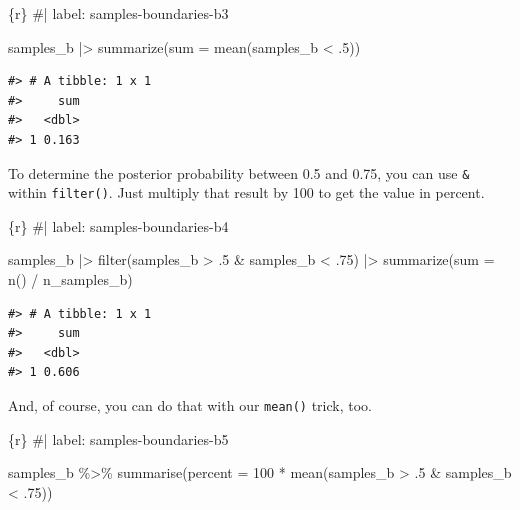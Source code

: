 \documentclass[
  letterpaper,
  DIV=11,
  numbers=noendperiod]{scrreprt}
\newenvironment{Shaded}{\begin{snugshade}}{\end{snugshade}}
\newcommand{\AttributeTok}[1]{\textcolor[rgb]{0.40,0.45,0.13}{#1}}
\newcommand{\CommentTok}[1]{\textcolor[rgb]{0.37,0.37,0.37}{#1}}
\newcommand{\DecValTok}[1]{\textcolor[rgb]{0.68,0.00,0.00}{#1}}
\newcommand{\FunctionTok}[1]{\textcolor[rgb]{0.28,0.35,0.67}{#1}}
\newcommand{\InformationTok}[1]{\textcolor[rgb]{0.37,0.37,0.37}{#1}}
\newcommand{\NormalTok}[1]{\textcolor[rgb]{0.00,0.23,0.31}{#1}}
\newcommand{\SpecialCharTok}[1]{\textcolor[rgb]{0.37,0.37,0.37}{#1}}
\begin{document}
\begin{Shaded}
\begin{Highlighting}[]
\InformationTok{\textasciigrave{}\textasciigrave{}\textasciigrave{}\{r\}}
\CommentTok{\#| label: samples{-}boundaries{-}b3}

\NormalTok{samples\_b }\SpecialCharTok{|\textgreater{}} 
    \FunctionTok{summarize}\NormalTok{(}\AttributeTok{sum =} \FunctionTok{mean}\NormalTok{(samples\_b }\SpecialCharTok{\textless{}}\NormalTok{ .}\DecValTok{5}\NormalTok{))}
\InformationTok{\textasciigrave{}\textasciigrave{}\textasciigrave{}}
\end{Highlighting}
\end{Shaded}

\begin{verbatim}
#> # A tibble: 1 x 1
#>     sum
#>   <dbl>
#> 1 0.163
\end{verbatim}

To determine the posterior probability between 0.5 and 0.75, you can use
\texttt{\&} within \texttt{filter()}. Just multiply that result by 100
to get the value in percent.

\begin{Shaded}
\begin{Highlighting}[]
\InformationTok{\textasciigrave{}\textasciigrave{}\textasciigrave{}\{r\}}
\CommentTok{\#| label: samples{-}boundaries{-}b4}

\NormalTok{samples\_b }\SpecialCharTok{|\textgreater{}} 
    \FunctionTok{filter}\NormalTok{(samples\_b }\SpecialCharTok{\textgreater{}}\NormalTok{ .}\DecValTok{5} \SpecialCharTok{\&}\NormalTok{ samples\_b }\SpecialCharTok{\textless{}}\NormalTok{ .}\DecValTok{75}\NormalTok{) }\SpecialCharTok{|\textgreater{}} 
    \FunctionTok{summarize}\NormalTok{(}\AttributeTok{sum =} \FunctionTok{n}\NormalTok{() }\SpecialCharTok{/}\NormalTok{ n\_samples\_b)}
\InformationTok{\textasciigrave{}\textasciigrave{}\textasciigrave{}}
\end{Highlighting}
\end{Shaded}

\begin{verbatim}
#> # A tibble: 1 x 1
#>     sum
#>   <dbl>
#> 1 0.606
\end{verbatim}

And, of course, you can do that with our \texttt{mean()} trick, too.

\begin{Shaded}
\begin{Highlighting}[]
\InformationTok{\textasciigrave{}\textasciigrave{}\textasciigrave{}\{r\}}
\CommentTok{\#| label: samples{-}boundaries{-}b5}

\NormalTok{samples\_b }\SpecialCharTok{\%\textgreater{}\%}
  \FunctionTok{summarise}\NormalTok{(}\AttributeTok{percent =} \DecValTok{100} \SpecialCharTok{*} \FunctionTok{mean}\NormalTok{(samples\_b }\SpecialCharTok{\textgreater{}}\NormalTok{ .}\DecValTok{5} \SpecialCharTok{\&}\NormalTok{ samples\_b }\SpecialCharTok{\textless{}}\NormalTok{ .}\DecValTok{75}\NormalTok{))}
\InformationTok{\textasciigrave{}\textasciigrave{}\textasciigrave{}}
\end{Highlighting}
\end{Shaded}
\end{document}
